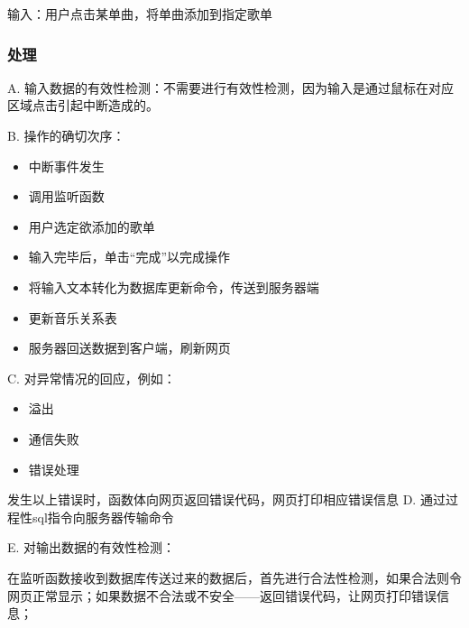 				  输入：用户点击某单曲，将单曲添加到指定歌单
				  
				  \subsubsection{处理}
				  
			   
				  
				  A. 输入数据的有效性检测：不需要进行有效性检测，因为输入是通过鼠标在对应区域点击引起中断造成的。
				  
				  B. 操作的确切次序：
				  \begin{adjustwidth}{2cm}{1cm}\qquad
					  \begin{itemize}
						  \item 中断事件发生
						  \item 调用监听函数
						  \item 用户选定欲添加的歌单
						  \item 输入完毕后，单击“完成”以完成操作
						  \item 将输入文本转化为数据库更新命令，传送到服务器端
						  \item 更新音乐关系表
						  \item 服务器回送数据到客户端，刷新网页
					  \end{itemize}		
				  \end{adjustwidth}
				   
				  
				  C. 对异常情况的回应，例如：
				  \begin{adjustwidth}{2cm}{1cm}\qquad
					  \begin{itemize}
						  \item 溢出
						  \item 通信失败
						  \item 错误处理
					  \end{itemize}		
				  \end{adjustwidth}
				  
					  发生以上错误时，函数体向网页返回错误代码，网页打印相应错误信息
				  D. 通过过程性sql指令向服务器传输命令
						  
				  E. 对输出数据的有效性检测：
				  
				  在监听函数接收到数据库传送过来的数据后，首先进行合法性检测，如果合法则令网页正常显示；如果数据不合法或不安全——返回错误代码，让网页打印错误信息；
				  
